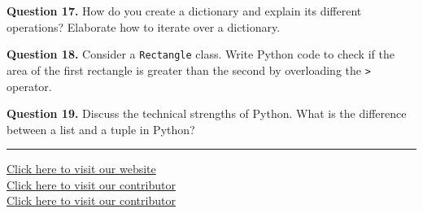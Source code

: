 \documentclass[11pt,a4paper]{article}
\begin{document}
\medskip


\noindent   \textbf{Question 17.} How do you create a dictionary and explain its different operations? Elaborate how to iterate over a dictionary.

\medskip


\noindent   \textbf{Question 18.} Consider a   \texttt{Rectangle} class. Write Python code to check if the area of the first rectangle is greater than the second by overloading the   \texttt{>} operator.

\medskip


\noindent   \textbf{Question 19.} Discuss the technical strengths of Python. What is the difference between a list and a tuple in Python?

\vfill
\rule{\linewidth}{0.4pt}

\begin{center}\small
\href{https://bhu-exam.vercel.app/}{Click here to visit our website}\\[4pt]\href{https://me-aryan.vercel.app/}{Click here to visit our contributor}\\[4pt]\href{https://quashan-me.vercel.app/}{Click here to visit our contributor}
\end{center}
\end{document}
